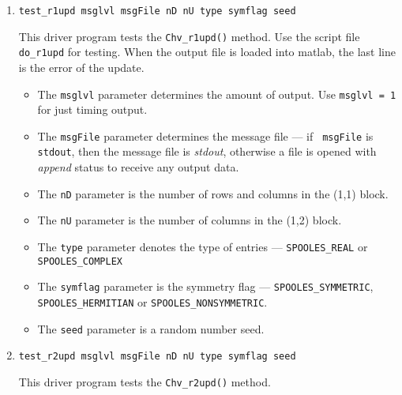 \begin{enumerate}
\begin{itemize}
{\tt SPOOLES\_REAL} or {\tt SPOOLES\_COMPLEX} 
\item
The {\tt symflag} parameter is the symmetry flag ---
{\tt SPOOLES\_SYMMETRIC}, {\tt SPOOLES\_HERMITIAN}
or {\tt SPOOLES\_NONSYMMETRIC}.
\item
The {\tt pivotingflag} parameter is the pivoting flag ---
{\tt SPOOLES\_NO\_PIVOTING} for no pivoting,
{\tt SPOOLES\_PIVOTING} for pivoting.
\item
The {\tt seed} parameter is a random number seed.
\end{itemize}
\item
\begin{verbatim}
test_r1upd msglvl msgFile nD nU type symflag seed 
\end{verbatim}
This driver program tests the {\tt Chv\_r1upd()} method.
Use the script file {\tt do\_r1upd} for testing.
When the output file is loaded into matlab,
the last line is the error of the update.
\par
\begin{itemize}
\item
The {\tt msglvl} parameter determines the amount of output.
Use {\tt msglvl = 1} for just timing output.
\item
The {\tt msgFile} parameter determines the message file --- if {\tt
msgFile} is {\tt stdout}, then the message file is {\it stdout},
otherwise a file is opened with {\it append} status to receive any
output data.
\item
The {\tt nD} parameter is the number of rows and columns 
in the (1,1) block.
\item
The {\tt nU} parameter is the number of columns 
in the (1,2) block.
\item
The {\tt type} parameter denotes the type of entries ---
{\tt SPOOLES\_REAL} or {\tt SPOOLES\_COMPLEX} 
\item
The {\tt symflag} parameter is the symmetry flag ---
{\tt SPOOLES\_SYMMETRIC}, {\tt SPOOLES\_HERMITIAN}
or {\tt SPOOLES\_NONSYMMETRIC}.
\item
The {\tt seed} parameter is a random number seed.
\end{itemize}
\item
\begin{verbatim}
test_r2upd msglvl msgFile nD nU type symflag seed 
\end{verbatim}
This driver program tests the {\tt Chv\_r2upd()} method.

\end{enumerate}
